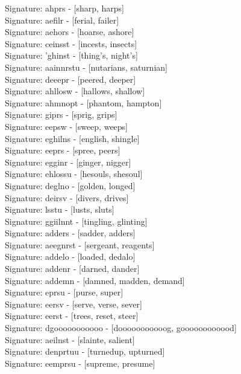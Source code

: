 Signature: {ahprs} - [sharp, harps] \\
Signature: {aefilr} - [ferial, failer] \\
Signature: {aehors} - [hoarse, ashore] \\
Signature: {ceinsst} - [incests, insects] \\
Signature: {'ghinst} - [thing's, night's] \\
Signature: {aainnrstu} - [nutarians, saturnian] \\
Signature: {deeepr} - [peered, deeper] \\
Signature: {ahllosw} - [hallows, shallow] \\
Signature: {ahmnopt} - [phantom, hampton] \\
Signature: {giprs} - [sprig, grips] \\
Signature: {eepsw} - [sweep, weeps] \\
Signature: {eghilns} - [english, shingle] \\
Signature: {eeprs} - [spree, peers] \\
Signature: {egginr} - [ginger, nigger] \\
Signature: {ehlossu} - [hesouls, shesoul] \\
Signature: {deglno} - [golden, longed] \\
Signature: {deirsv} - [divers, drives] \\
Signature: {lsstu} - [lusts, sluts] \\
Signature: {ggiilnnt} - [tingling, glinting] \\
Signature: {adders} - [sadder, adders] \\
Signature: {aeegnrst} - [sergeant, reagents] \\
Signature: {addelo} - [loaded, dedalo] \\
Signature: {addenr} - [darned, dander] \\
Signature: {addemn} - [damned, madden, demand] \\
Signature: {eprsu} - [purse, super] \\
Signature: {eersv} - [serve, verse, sever] \\
Signature: {eerst} - [trees, reset, steer] \\
Signature: {dgooooooooooo} - [dooooooooooog, goooooooooood] \\
Signature: {aeilnst} - [slainte, salient] \\
Signature: {denprtuu} - [turnedup, upturned] \\
Signature: {eemprsu} - [supreme, presume] \\
